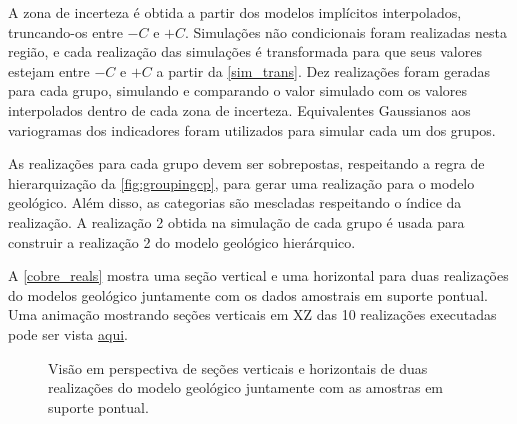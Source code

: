 A zona de incerteza é obtida a partir dos modelos implícitos interpolados, truncando-os entre $-C$ e $+C$. Simulações não condicionais foram realizadas nesta região, e cada realização das simulações é transformada para que seus valores estejam entre $-C$ e $+ C$ a partir da \autoref{sim_trans}. Dez realizações foram geradas para cada grupo, simulando e comparando o valor simulado com os valores interpolados dentro de cada zona de incerteza. Equivalentes Gaussianos aos variogramas dos indicadores foram utilizados para simular cada um dos grupos.

As realizações para cada grupo devem ser sobrepostas, respeitando a regra de hierarquização da \autoref{fig:groupingcp}, para gerar uma realização para o modelo geológico. Além disso, as categorias são mescladas respeitando o índice da realização. A realização 2 obtida na simulação de cada grupo é usada para construir a realização 2 do modelo geológico hierárquico.

A \autoref{cobre_reals} mostra uma seção vertical e uma horizontal para duas realizações do modelos geológico juntamente com os dados amostrais em suporte pontual. Uma animação mostrando seções verticais em XZ das 10 realizações executadas pode ser vista \href{https://github.com/robertorolo/hierarchical_boundary_simulation/blob/main/copper_gif.gif}{aqui}.

\begin{figure}[H]
	\caption{\label{cobre_reals} Visão em perspectiva de seções verticais e horizontais de duas realizações do modelo geológico juntamente com as amostras em suporte pontual.}
	\centering
     \hspace{1em}
\end{figure}

